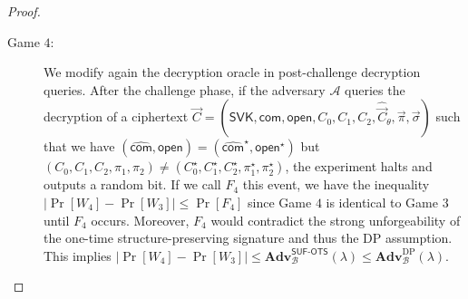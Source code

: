 \documentclass[10pt]{llncs}
\newcommand{\A}{\mathcal{A}}
\newcommand{\B}{\mathcal{B}}
\newcommand{\SVK}{\mathsf{SVK}}
\newcommand{\com}{\hat{\mathsf{com}}}
\newcommand{\open}{\mathsf{open}}
\begin{document}
\begin{proof}
\begin{description}
  \item[\textsf{Game} $4$:] We modify again the decryption oracle in  post-challenge decryption queries. After the challenge phase, if the adversary $\A$  queries the decryption of a ciphertext 
    $ \vec{C} = (\SVK, \com, \open, C_0, C_1, C_2, \hat{\vec{C}}_{\theta}, \vec{\pi}, \vec{\sigma})  $ such that we have $(\com,\open)=(\com^\star,\open^\star)$
    but $(C_0,C_1,C_2,\pi_1,\pi_2) \neq (C_0^\star,C_1^\star,C_2^\star,\pi_1^\star,\pi_2^\star)$, the experiment halts and outputs a random 
    bit. If we call $F_4$ this event, we have the inequality  $|\Pr[W_4]-\Pr[W_3]| \leq \Pr[F_4]$ since Game $4$ is identical to Game $3$ until $F_4$ occurs.
    Moreover,   $F_4$ would contradict the strong unforgeability of the one-time structure-preserving signature  and thus the DP assumption. This implies  
    $|\Pr[W_4]-\Pr[W_3]| \leq \mathbf{Adv}_\B^{\mathsf{SUF}\textsf{-}\mathsf{OTS}}(\lambda)   \leq   \mathbf{Adv}_\B^{\mathrm{DP}}(\lambda)$.
    \smallskip 


\end{description}
\end{proof}
\end{document}
